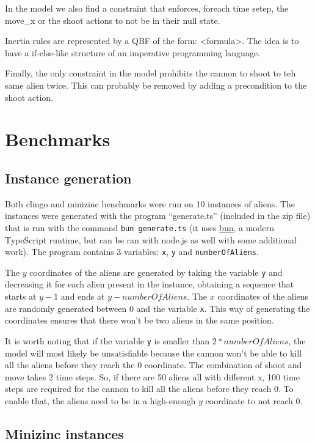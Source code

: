 \documentclass[11pt]{article}
\begin{document}
In the model we also find a constraint that enforces, foreach time setep, the move\_x or the shoot actions to not be in their null state.

Inertia rules are represented by a QBF of the form: <formula>.
The idea is to have a if-else-like structure of an imperative programming language.

Finally, the only constraint in the model prohibits the cannon to shoot to teh same alien twice.
This can probably be removed by adding a precondition to the shoot action.


\section{Benchmarks}

\subsection{Instance generation}
Both clingo and minizinc benchmarks were run on 10 instances of aliens.
The instances were generated with the program ``generate.ts'' (included in the zip file) that is run with the command \texttt{bun generate.ts} (it uses \href{https://bun.sh/}{bun}, a modern TypeScript runtime, but can be ran with node.js as well with some additional work).
The program contains 3 variables: \texttt{x}, \texttt{y} and \texttt{numberOfAliens}.

The $y$ coordinates of the aliens are generated by taking the variable \texttt{y} and decreasing it for each alien present in the instance, obtaining a sequence that starts at $y - 1$ and ends at $y - numberOfAliens$.
The $x$ coordinates of the aliens are randomly generated between 0 and the variable \texttt{x}.
This way of generating the coordinates ensures that there won't be two aliens in the same position.

It is worth noting that if the variable \texttt{y} is smaller than $2*numberOfAliens$, the model will most likely be unsatisfiable because the cannon won't be able to kill all the aliens before they reach the $0$ coordinate.
The combination of shoot and move takes 2 time steps.
So, if there are 50 aliens all with different x, 100 time steps are required for the cannon to kill all the aliens before they reach 0.
To enable that, the aliens need to be in a high-enough $y$ coordinate to not reach 0.

\subsection{Minizinc instances}
\end{document}
